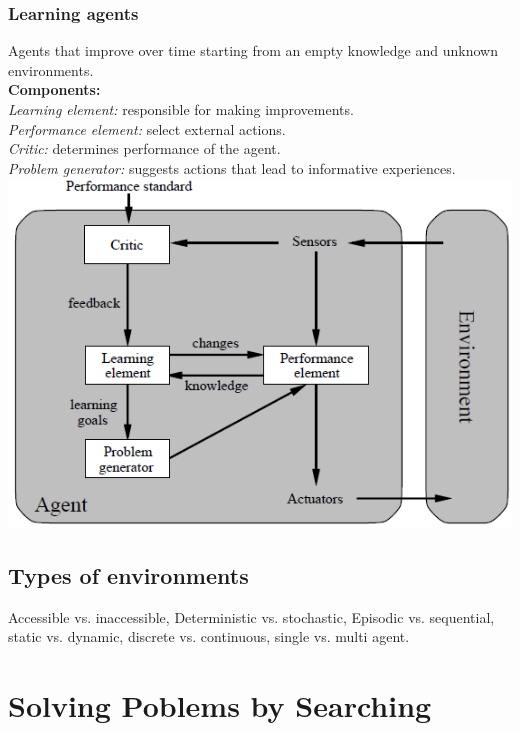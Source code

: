 \documentclass{article}
\begin{document}
\subsubsection{Learning agents}
Agents that improve over time starting from an empty knowledge and unknown environments.\\
\textbf{Components: }\\
\textit{Learning element:} responsible for making improvements.\\
\textit{Performance element:} select external actions.\\
\textit{Critic: }determines performance of the agent.\\
\textit{Problem generator: }suggests actions that lead to informative experiences.\\
\includegraphics[scale=0.5]{7.png}
\subsection{Types of environments}
Accessible vs. inaccessible, Deterministic vs. stochastic, Episodic vs. sequential, static vs. dynamic, discrete vs. continuous, single vs. multi agent.

\section{Solving Poblems by Searching}
\end{document}
